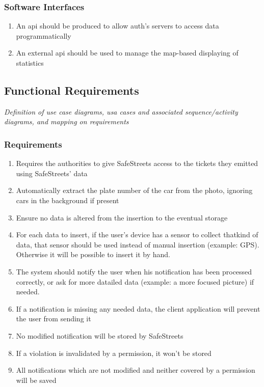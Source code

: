 \documentclass{article}
\newcommand{\enum}[1]{\texttt{#1.\arabic*}}
\begin{document}
		\subsubsection{Software Interfaces}
			\begin{enumerate}[label=\enum{SW}]
				\item An api should be produced to allow auth's servers to access data programmatically
				\item An external api should be used to manage the map-based displaying of statistics
			\end{enumerate}
			
	\subsection{Functional Requirements} \textit{Definition of use case diagrams, usa cases and associated sequence/activity diagrams, and mapping on requirements}
			
		\subsubsection{Requirements}
		
			\begin{enumerate}[label=\enum{R}]
				\item \label{R_storeTickets}Requires the authorities to give SafeStreets access to the tickets they emitted using SafeStreets' data
				\item \label{R_autoPlate}Automatically extract the plate number of the car from the photo, ignoring cars in the background if present
				\item \label{R_unalteredData}Ensure no data is altered from the insertion to the eventual storage
				\item \label{R_dataGather}For each data to insert, if the  user's device has a sensor to collect thatkind of data, that sensor should be used instead of manual insertion (example: GPS). Otherwise it will be possible to insert it by hand.
				\item \label{R_notifyUser}The system should notify the user when his notification has been processed correctly, or ask for more datailed data (example: a more focused picture) if needed.
				\item \label{R_fullData}If a notification is missing any needed data, the client application will prevent the user from sending it
				\item \label{R_modifiedNotStored}No modified notification will be stored by SafeStreets
				\item \label{R_validPermissionNotStored}If a violation is invalidated by a permission, it won't be stored
				\item \label{R_legitNotificationsAlwaysStored}All notifications which are not modified and neither covered by a permission will be saved
			\end{enumerate}
				
\end{document}
